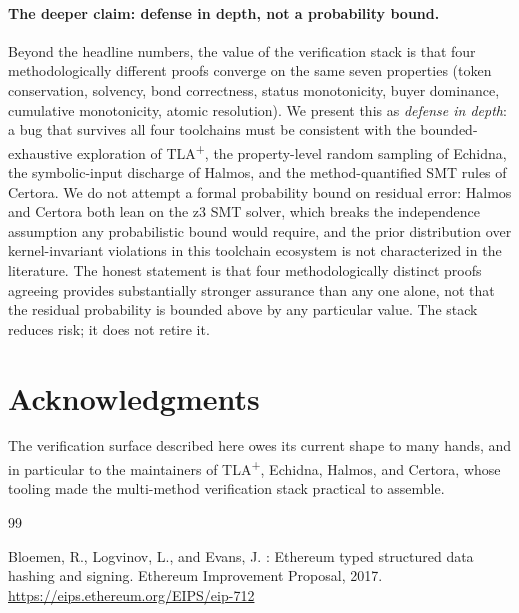 \documentclass[11pt,a4paper]{article}
\theoremstyle{definition}
\theoremstyle{remark}
\begin{document}
\paragraph{The deeper claim: defense in depth, not a probability bound.}
Beyond the headline numbers, the value of the verification stack
is that four methodologically different proofs converge on the
same seven properties (token conservation, solvency, bond
correctness, status monotonicity, buyer dominance, cumulative
monotonicity, atomic resolution). We present this as
\emph{defense in depth}: a bug that survives all four toolchains
must be consistent with the bounded-exhaustive exploration of
TLA\textsuperscript{+}, the property-level random sampling of
Echidna, the symbolic-input discharge of Halmos, and the
method-quantified SMT rules of Certora. We do not attempt a
formal probability bound on residual error: Halmos and Certora
both lean on the z3 SMT solver, which breaks the independence
assumption any probabilistic bound would require, and the prior
distribution over kernel-invariant violations in this toolchain
ecosystem is not characterized in the literature. The honest
statement is that four methodologically distinct proofs agreeing
provides substantially stronger assurance than any one alone, not
that the residual probability is bounded above by any particular
value. The stack reduces risk; it does not retire it.

\section*{Acknowledgments}
The verification surface described here owes its current shape to
many hands, and in particular to the maintainers of
TLA\textsuperscript{+}, Echidna, Halmos, and Certora, whose tooling
made the multi-method verification stack practical to assemble.



\begin{thebibliography}{99}

Bloemen, R., Logvinov, L., and Evans, J.
: Ethereum typed structured data hashing and signing.
\newblock Ethereum Improvement Proposal, 2017.
\newblock \url{https://eips.ethereum.org/EIPS/eip-712}

\end{thebibliography}
\end{document}
